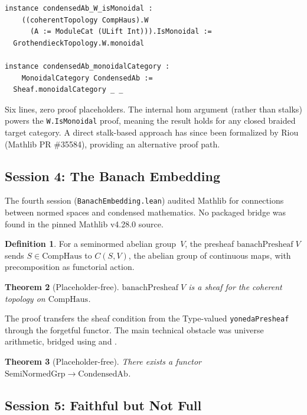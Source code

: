 \documentclass[11pt]{amsart}
\theoremstyle{plain}
\newtheorem{theorem}{Theorem}[section]
\theoremstyle{definition}
\newtheorem{definition}[theorem]{Definition}
\newcommand{\CondAb}{\mathrm{CondensedAb}}
\newcommand{\CompHaus}{\mathrm{CompHaus}}
\newcommand{\SemiNormedGrp}{\mathrm{SemiNormedGrp}}
\begin{document}
\begin{lstlisting}
instance condensedAb_W_isMonoidal :
    ((coherentTopology CompHaus).W
      (A := ModuleCat (ULift Int))).IsMonoidal :=
  GrothendieckTopology.W.monoidal

instance condensedAb_monoidalCategory :
    MonoidalCategory CondensedAb :=
  Sheaf.monoidalCategory _ _
\end{lstlisting}

Six lines, zero proof placeholders. The internal hom argument (rather than stalks) powers the \texttt{W.IsMonoidal} proof, meaning the result holds for any closed braided target category. A direct stalk-based approach has since been formalized by Riou (Mathlib PR \#35584), providing an alternative proof path.

\subsection{Session 4: The Banach Embedding}

The fourth session (\texttt{BanachEmbedding.lean}) audited Mathlib for connections between normed spaces and condensed mathematics. No packaged bridge was found in the pinned Mathlib v4.28.0 source.

\begin{definition}
For a seminormed abelian group~$V$, the presheaf $\mathrm{banachPresheaf}\;V$ sends $S \in \CompHaus$ to $C(S,V)$, the abelian group of continuous maps, with precomposition as functorial action.
\end{definition}

\begin{theorem}[Placeholder-free]
\label{thm:sheaf}
$\mathrm{banachPresheaf}\;V$ is a sheaf for the coherent topology on $\CompHaus$.
\end{theorem}

The proof transfers the sheaf condition from the Type-valued \texttt{yonedaPresheaf} through the forgetful functor. The main technical obstacle was universe arithmetic, bridged using  and .

\begin{theorem}[Placeholder-free]
There exists a functor $\SemiNormedGrp \to \CondAb$.
\end{theorem}

\subsection{Session 5: Faithful but Not Full}
\end{document}

